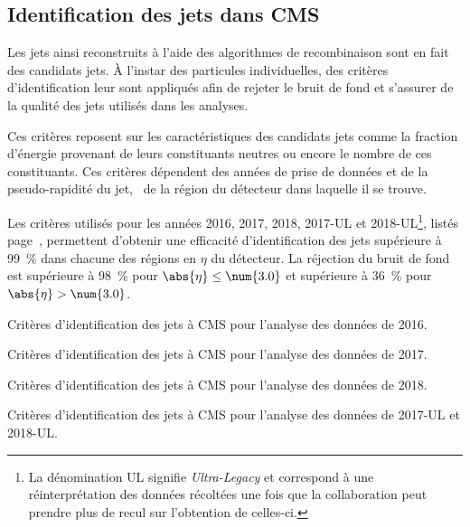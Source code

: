 \subsection{Identification des jets dans CMS}\label{chapter-JERC-section-jets_reco-subsec-jetID}
Les jets ainsi reconstruits à l'aide des algorithmes de recombinaison sont en fait des \og candidats \fg{} jets.
À l'instar des particules individuelles, des critères d'identification leur sont appliqués afin de rejeter le bruit de fond et s'assurer de la qualité des jets utilisés dans les analyses.
\par Ces critères reposent sur les caractéristiques des candidats jets comme la fraction d'énergie provenant de leurs constituants neutres ou encore le nombre de ces constituants.
Ces critères dépendent des années de prise de données et de la pseudo-rapidité du jet, \ie\ de la région du détecteur dans laquelle il se trouve.
\par Les critères utilisés pour les années 2016, 2017, 2018, 2017-UL et 2018-UL\footnote{La dénomination \og UL \fg{} signifie \emph{Ultra-Legacy} et correspond à une réinterprétation des données récoltées une fois que la collaboration peut prendre plus de recul sur l'obtention de celles-ci.}, listés page~\pageref{tab-chapter-JERC-section-jets_reco-subsec-jetID-2017UL}, permettent d'obtenir une efficacité d'identification des jets supérieure à \SI{99}{\%} dans chacune des régions en $\eta$ du détecteur.
La réjection du bruit de fond est supérieure à \SI{98}{\%} pour $\abs{\eta}\leq\num{3.0}$ et supérieure à \SI{36}{\%} pour $\abs{\eta}>\num{3.0}$.
\begin{table}[p]
\centering

\caption[Critères d'identification des jets pour l'année 2016.]{Critères d'identification des jets à CMS pour l'analyse des données de 2016.}
\label{tab-chapter-JERC-section-jets_reco-subsec-jetID-2016}
\end{table}
\begin{table}[p]
\centering

\caption[Critères d'identification des jets pour l'année 2017.]{Critères d'identification des jets à CMS pour l'analyse des données de 2017.}
\label{tab-chapter-JERC-section-jets_reco-subsec-jetID-2017}
\end{table}
\begin{table}[p]
\centering

\caption[Critères d'identification des jets pour l'année 2018.]{Critères d'identification des jets à CMS pour l'analyse des données de 2018.}
\label{tab-chapter-JERC-section-jets_reco-subsec-jetID-2018}
\end{table}
\begin{table}[p]
\centering

\caption[Critères d'identification des jets pour les années 2017-UL et 2018-UL.]{Critères d'identification des jets à CMS pour l'analyse des données de 2017-UL et 2018-UL.}
\label{tab-chapter-JERC-section-jets_reco-subsec-jetID-2017UL}
\end{table}
